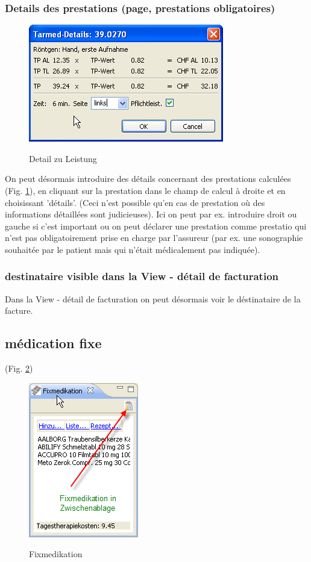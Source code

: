 \documentclass[a4paper]{scrartcl}
\begin{document}
\subsubsection{Details des prestations (page, prestations obligatoires)}
\begin{figure}
  \includegraphics{tarmeddetail1}\\
  \caption{Detail zu Leistung}\label{fig:detail1}
\end{figure}

On peut désormais introduire des détails concernant des prestations calculées (Fig. \ref{fig:detail1}), en cliquant sur la prestation dans le champ de calcul à droite et en choisissant 'détails'. (Ceci n'est possible qu'en cas de prestation où des informations détaillées sont judicieuses). Ici on peut par ex. introduire droit ou gauche si c'est important ou on peut déclarer une prestation comme prestatio qui n'est pas obligatoirement prise en charge par l'assureur (par ex. une sonographie souhaitée par le patient mais qui n'était médicalement pas indiquée). 

\subsubsection{destinataire visible dans la View - détail de facturation}
Dans la View - détail de facturation on peut désormais voir le déstinataire de la facture. 

\subsection{médication fixe}
(Fig. \ref{fig:fixmedi})
\begin{figure}
  \includegraphics{fixmedi3}\\
  \caption{Fixmedikation}\label{fig:fixmedi}
\end{figure}
\end{document}
